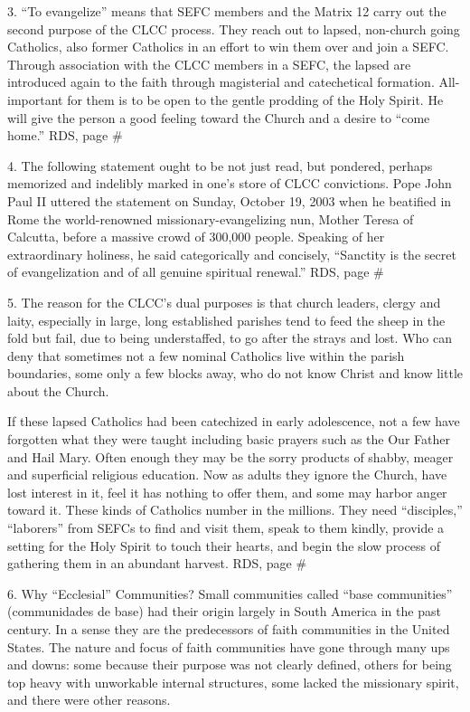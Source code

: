 \documentclass[oneside]{book}
\begin{document}
3. ``To evangelize'' means that SEFC members and the Matrix 12 carry out the
second purpose of the CLCC process. They reach out to lapsed, non-church going
Catholics, also former Catholics in an effort to win them over and join a
SEFC. Through association with the CLCC members in a SEFC, the lapsed are
introduced again to the faith through magisterial and catechetical
formation. All-important for them is to be open to the gentle prodding of the
Holy Spirit. He will give the person a good feeling toward the Church and a
desire to ``come home.''
RDS, page \#

4. The following statement ought to be not just read, but pondered, perhaps
memorized and indelibly marked in one's store of CLCC convictions. Pope John
Paul II uttered the statement on Sunday, October 19, 2003 when he beatified in
Rome the world-renowned missionary-evangelizing nun, Mother Teresa of Calcutta,
before a massive crowd of 300,000 people. Speaking of her extraordinary
holiness, he said categorically and concisely, ``Sanctity is the secret of
evangelization and of all genuine spiritual renewal.''
RDS, page \#

5. The reason for the CLCC's dual purposes is that church leaders, clergy and
laity, especially in large, long established parishes tend to feed the sheep in
the fold but fail, due to being understaffed, to go after the strays and
lost. Who can deny that sometimes not a few nominal Catholics live within the
parish boundaries, some only a few blocks away, who do not know Christ and know
little about the Church.

If these lapsed Catholics had been catechized in early adolescence, not a few
have forgotten what they were taught including basic prayers such as the Our
Father and Hail Mary. Often enough they may be the sorry products of shabby,
meager and superficial religious education. Now as adults they ignore the
Church, have lost interest in it, feel it has nothing to offer them, and some
may harbor anger toward it. These kinds of Catholics number in the
millions. They need ``disciples,'' ``laborers'' from SEFCs to find and visit
them, speak to them kindly, provide a setting for the Holy Spirit to touch their
hearts, and begin the slow process of gathering them in an abundant harvest.
RDS, page \#

6. Why ``Ecclesial'' Communities?
Small communities called ``base communities'' (communidades de base) had their
origin largely in South America in the past century. In a sense they are the
predecessors of faith communities in the United States. The nature and focus of
faith communities have gone through many ups and downs: some because their
purpose was not clearly defined, others for being top heavy with unworkable
internal structures, some lacked the missionary spirit, and there were other reasons.
\end{document}
